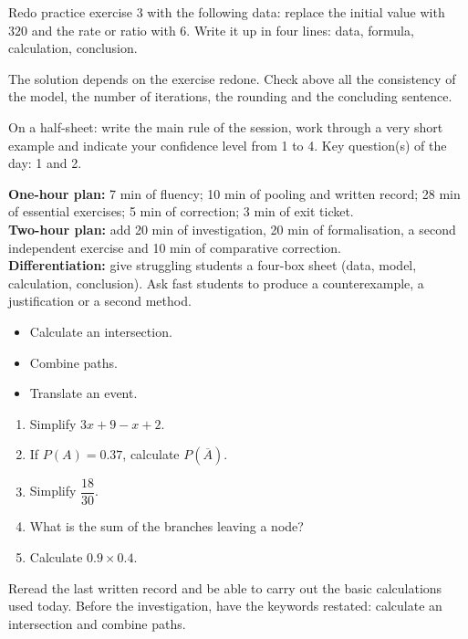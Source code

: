 
    \begin{homework}Redo practice exercise 3 with the following data: replace the initial value with $320$ and the rate or ratio with $6$. Write it up in four lines: data, formula, calculation, conclusion.\end{homework}
    \begin{solution}The solution depends on the exercise redone. Check above all the consistency of the model, the number of iterations, the rounding and the concluding sentence.\end{solution}

    \begin{exitticket}[3 minutes]On a half-sheet: write the main rule of the session, work through a very short example and indicate your confidence level from 1 to 4. Key question(s) of the day: 1 and 2.\end{exitticket}

    \ifmxteacher
    \begin{method}
    \textbf{One-hour plan:} 7 min of fluency; 10 min of pooling and written record; 28 min of essential exercises; 5 min of correction; 3 min of exit ticket.\\
\textbf{Two-hour plan:} add 20 min of investigation, 20 min of formalisation, a second independent exercise and 10 min of comparative correction.\\
\textbf{Differentiation:} give struggling students a four-box sheet (data, model, calculation, conclusion). Ask fast students to produce a counterexample, a justification or a second method.
    \end{method}
    \fi
{}
    \begin{objectives}\begin{itemize}\item Calculate an intersection.\item Combine paths.\item Translate an event.\end{itemize}\end{objectives}
    \begin{fluency}\begin{enumerate}\item Simplify $3x+9-x+2$. \item If $P(A)=\num{0,37}$, calculate $P(\overline A)$. \item Simplify $\dfrac{18}{30}$. \item What is the sum of the branches leaving a node? \item Calculate $\num{0,9}\times\num{0,4}$. \end{enumerate}\end{fluency}
    \begin{prerequisites}Reread the last written record and be able to carry out the basic calculations used today. Before the investigation, have the keywords restated: calculate an intersection and combine paths.\end{prerequisites}

